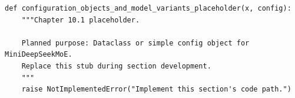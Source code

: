 \begin{lstlisting}[style=bookpython,caption={Planned code placeholder for configuration objects and model variants.},label={lst:ch10-configuration-objects-and-model-variants}]
def configuration_objects_and_model_variants_placeholder(x, config):
    """Chapter 10.1 placeholder.

    Planned purpose: Dataclass or simple config object for MiniDeepSeekMoE.
    Replace this stub during section development.
    """
    raise NotImplementedError("Implement this section's code path.")
\end{lstlisting}
